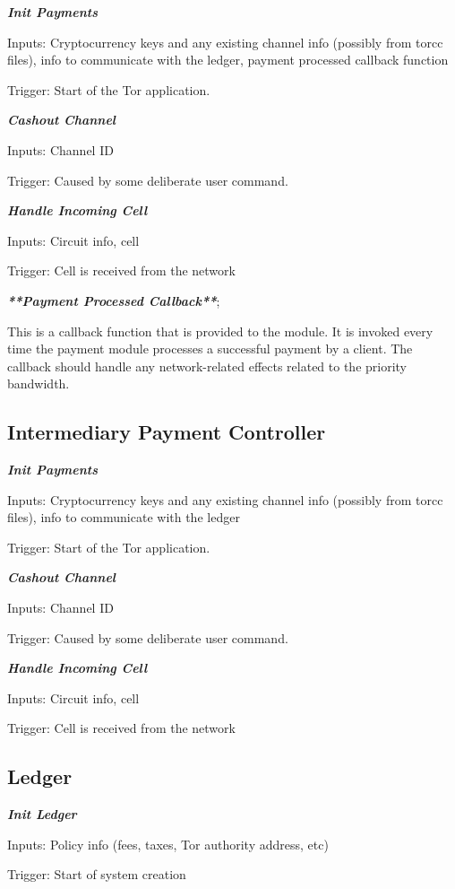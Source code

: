 \documentclass{article}
\begin{document}
\textbf{\emph{Init Payments}}

Inputs: Cryptocurrency keys and any existing channel info (possibly from torcc files), info to
communicate with the ledger, payment processed callback function

Trigger: Start of the Tor application.

\textbf{\emph{Cashout Channel}}

Inputs: Channel ID

Trigger: Caused by some deliberate user command.

\textbf{\emph{Handle Incoming Cell}}

Inputs: Circuit info, cell

Trigger: Cell is received from the network

\textbf{\emph{**Payment Processed Callback**}};

This is a callback function that is provided to the module. It is invoked every
time the payment module processes a successful payment by a client. The callback
should handle any network-related effects related to the priority bandwidth.

\subsection{Intermediary Payment Controller}

\textbf{\emph{Init Payments}}

Inputs: Cryptocurrency keys and any existing channel info (possibly from torcc files), info to
communicate with the ledger

Trigger: Start of the Tor application.

\textbf{\emph{Cashout Channel}}

Inputs: Channel ID

Trigger: Caused by some deliberate user command.

\textbf{\emph{Handle Incoming Cell}}

Inputs: Circuit info, cell

Trigger: Cell is received from the network

\subsection{Ledger}

\textbf{\emph{Init Ledger}}

Inputs: Policy info (fees, taxes, Tor authority address, etc)

Trigger: Start of system creation
\end{document}
